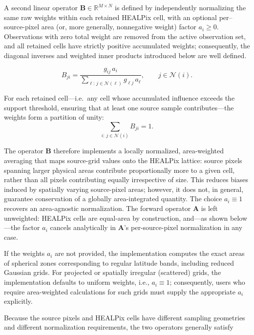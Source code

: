 \documentclass[journal]{IEEEtran}
\newcommand{\healpix}{HEALPix\xspace}
\begin{document}
A second linear operator $\mathbf{B}\in\mathbb{R}^{M\times N}$ is defined by independently normalizing the same raw weights within each retained \healpix cell, with an optional per–source-pixel area (or, more generally, nonnegative weight) factor $a_i\ge 0$. Observations with zero total weight are removed from the active observation set, and all retained cells have strictly positive accumulated weights; consequently, the diagonal inverses and weighted inner products introduced below are well defined.

\begin{equation}
B_{ji}
=
\frac{g_{ij}\,a_i}
{\displaystyle
 \sum_{\ell:\,j\in\mathcal{N}(\ell)}g_{\ell j}\,a_\ell},
\qquad
j\in\mathcal{N}(i).
\label{eq:back_operator}
\end{equation}

For each retained cell—i.e.\ any cell whose accumulated influence exceeds the support threshold, ensuring that at least one source sample contributes—the weights form a partition of unity:
\begin{equation}
\sum_{i:\,j\in\mathcal{N}(i)}B_{ji}=1.
\end{equation}

The operator $\mathbf{B}$ therefore implements a locally normalized, area-weighted averaging that maps source-grid values onto the \healpix lattice: source pixels spanning larger physical areas contribute proportionally more to a given cell, rather than all pixels contributing equally irrespective of size. This reduces biases induced by spatially varying source-pixel areas; however, it does not, in general, guarantee conservation of a globally area-integrated quantity. The choice $a_i\equiv 1$ recovers an area-agnostic normalization. The forward operator $\mathbf{A}$ is left unweighted: \healpix cells are equal-area by construction, and—as shown below—the factor $a_i$ cancels analytically in $\mathbf{A}$’s per-source-pixel normalization in any case.

If the weights $a_i$ are not provided, the implementation computes the exact areas of spherical zones corresponding to regular latitude bands, including reduced Gaussian grids. For projected or spatially irregular (scattered) grids, the implementation defaults to uniform weights, i.e., $a_i \equiv 1$; consequently, users who require area-weighted calculations for such grids must supply the appropriate $a_i$ explicitly.

Because the source pixels and \healpix cells have different
sampling geometries and different normalization requirements,
the two operators generally satisfy
\end{document}

